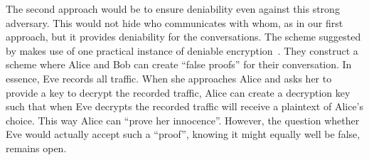 The second approach would be to ensure deniability even against this strong 
adversary.
This would not hide who communicates with whom, as in our first approach, but 
it provides deniability for the conversations.
The scheme suggested by \textcite{OTPKX} makes use of one practical instance of 
deniable encryption~\cite{DeniableEncryption}.
They construct a scheme where Alice and Bob can create \enquote{false proofs} 
for their conversation.
In essence, Eve records all traffic.
When she approaches Alice and asks her to provide a key to decrypt the recorded 
traffic, Alice can create a decryption key such that when Eve decrypts the 
recorded traffic will receive a plaintext of Alice's choice.
This way Alice can \enquote{prove her innocence}.
However, the question whether Eve would actually accept such a \enquote{proof}, 
knowing it might equally well be false, remains open.
